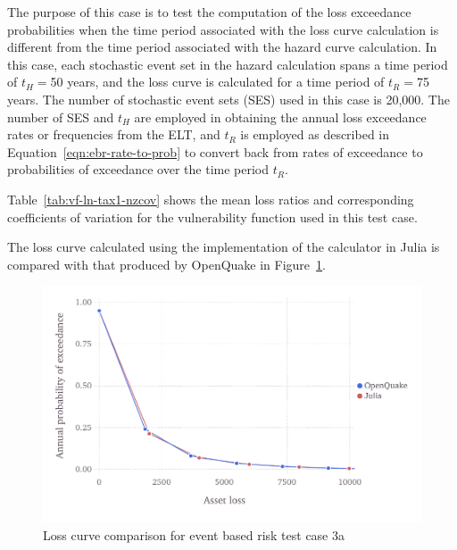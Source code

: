 The purpose of this case is to test the computation of the loss exceedance probabilities when the time period associated with the loss curve calculation is different from the time period associated with the hazard curve calculation. In this case, each stochastic event set in the hazard calculation spans a time period of $t_H = $50 years, and the loss curve is calculated for a time period of $t_R = $75 years. The number of stochastic event sets (SES) used in this case is 20,000. The number of SES and $t_H$ are employed in obtaining the annual loss exceedance rates or frequencies from the ELT, and $t_R$ is employed as described in Equation~\ref{eqn:ebr-rate-to-prob} to convert back from rates of exceedance to probabilities of exceedance over the time period $t_R$.

Table~\ref{tab:vf-ln-tax1-nzcov} shows the mean loss ratios and corresponding coefficients of variation for the vulnerability function used in this test case.

The loss curve calculated using the implementation of the calculator in Julia is compared with that produced by OpenQuake in Figure~\ref{fig:lc-ebr-3a}.

\begin{figure}[htbp]
\centering
\includegraphics[width=12cm]{qareport/figures/fig-lc-ebr-3a}
\caption{Loss curve comparison for event based risk test case 3a}
\label{fig:lc-ebr-3a}
\end{figure}